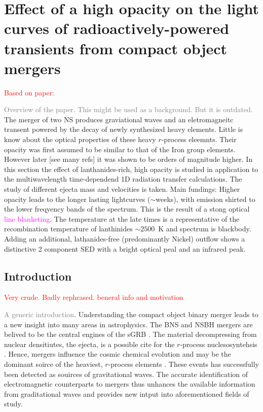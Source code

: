 \documentclass[11pt,a4paper,headinclude=true,DIV=14,BCOR=8mm,chapterprefix,listof=totoc,twoside,openright,abstracton]{scrbook}
\newcommand{\red}[1]{\textcolor{red}{#1}}
\newcommand{\magenta}[1]{\textcolor{magenta}{#1}} %
\newcommand{\gray}[1]{\textcolor{gray}{#1}}
\begin{document}
\section{Effect of a high opacity on the light curves of radioactively-powered transients from compact object mergers}
\red{Based on paper: \cite{Barnes & Kasen (2013)}}


\gray{Overview of the paper. This might be used as a background. But it is outdated. }
The merger of two NS produces graviational waves and an eletromagneitc transent powered by the decay of newly synthesized heavy elements. Little is know about the optical properties of these heavy $r$-process eleemnts. Their opacity was first assumed to be similar to that of the Iron group elements. 
However later [see many refs] it was shown to be orders of magnitude higher.
In this section the effect of lanthanides-rich, high opacity is studied in application to the multiwavelength time-dependend 1D radiation transfer calculations. The study of different ejecta mass and velocities is taken.
%
Main fundings: 
Higher opacity leads to the longer lasting lightcurves ($\sim$weeks), with emission shirted to the lower freqyency bands of the spectrum. This is the result of a stong optical \magenta{line blanketing}. The temperature at the late times is a representative of the recombination temperature of lanthinides $\sim 2500$~K and spectrum is blackbody. 
Adding an additional, lathanides-free (predominantly Nickel) outflow shows a distinctive 2 component SED with a bright optical peal and an infrared peak. 


\subsection{Introduction}
\red{Very crude. Badly rephrased. beneral info and motivation}

\gray{A generic introduction}. Understanding the compact object binary merger leads to a new insight into many areas in astrophysics. 
The BNS and NSBH mergers are belived to be the central engines of the sGRB \cite{(Paczynski 1986; Narayan et al. 1992), [and many others]}.
The material decompressing from nuclear densitiutes, the ejecta, is a possible cite for the $r$-process nuclesosyntehsis \cite{(Lattimer & Schramm 1974, 1976) [and many others]}.
Hence, mergers influence the cosmic chemical evolution and may be the dominant soirce of the heaviest, $r$-process elements \cite{(e.g. Eichler et al. 1989b; Rosswog et al. 1998; Freiburghaus et al. 1999; Rosswog et al. 2000; Rosswog 2005; Goriely et al. 2005). [and many more]}.
These events has successfully been detected as souirces of gravitational waves. \cite{LIGO}
The accurate identification of electromagnetic counterparts to mergers thus unhances the available information from graditational waves \cite{(e.g. Schutz 1986, 2002; Stubbs 2008; Bloom et al. 2009)} and provides new intput into aforementioned fields of study.
\end{document}
